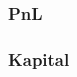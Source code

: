 \documentclass[8pt]{article} %
\begin{document}

%
%
\subsubsection{PnL}
%

\subsubsection{Kapital}
%



%

%

%
\end{document}
